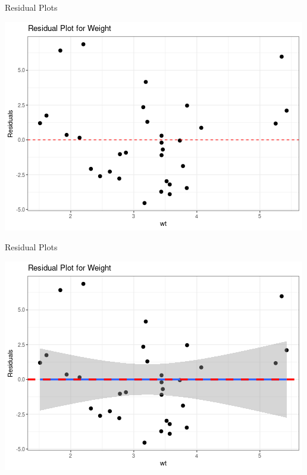 \documentclass{beamer}
\begin{document}
\begin{frame}{Residual Plots}
\begin{center}
\includegraphics[scale=0.5]{wt_resid.png}
\end{center}
\end{frame}

\begin{frame}{Residual Plots}
\begin{center}
\includegraphics[scale=0.5]{wt_resid2.png}
\end{center}
\end{frame}
\end{document}
